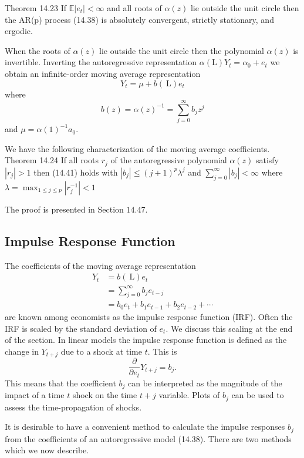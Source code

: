 \documentclass[10pt]{article}
\begin{document}
Theorem 14.23 If $\mathbb{E}\left|e_{t}\right|<\infty$ and all roots of $\alpha(z)$ lie outside the unit circle then the AR(p) process (14.38) is absolutely convergent, strictly stationary, and ergodic.

When the roots of $\alpha(z)$ lie outside the unit circle then the polynomial $\alpha(z)$ is invertible. Inverting the autoregressive representation $\alpha(\mathrm{L}) Y_{t}=\alpha_{0}+e_{t}$ we obtain an infinite-order moving average representation
$$
Y_{t}=\mu+b(\mathrm{~L}) e_{t}
$$
where
$$
b(z)=\alpha(z)^{-1}=\sum_{j=0}^{\infty} b_{j} z^{j}
$$
and $\mu=\alpha(1)^{-1} a_{0}$.

We have the following characterization of the moving average coefficients. Theorem 14.24 If all roots $r_{j}$ of the autoregressive polynomial $\alpha(z)$ satisfy $\left|r_{j}\right|>1$ then (14.41) holds with $\left|b_{j}\right| \leq(j+1)^{p} \lambda^{j}$ and $\sum_{j=0}^{\infty}\left|b_{j}\right|<\infty$ where $\lambda=\max _{1 \leq j \leq p}\left|r_{j}^{-1}\right|<1$

The proof is presented in Section $14.47$.

\subsection{Impulse Response Function}
The coefficients of the moving average representation
$$
\begin{aligned}
Y_{t} &=b(\mathrm{~L}) e_{t} \\
&=\sum_{j=0}^{\infty} b_{j} e_{t-j} \\
&=b_{0} e_{t}+b_{1} e_{t-1}+b_{2} e_{t-2}+\cdots
\end{aligned}
$$
are known among economists as the impulse response function (IRF). Often the IRF is scaled by the standard deviation of $e_{t}$. We discuss this scaling at the end of the section. In linear models the impulse response function is defined as the change in $Y_{t+j}$ due to a shock at time $t$. This is
$$
\frac{\partial}{\partial e_{t}} Y_{t+j}=b_{j} .
$$
This means that the coefficient $b_{j}$ can be interpreted as the magnitude of the impact of a time $t$ shock on the time $t+j$ variable. Plots of $b_{j}$ can be used to assess the time-propagation of shocks.

It is desirable to have a convenient method to calculate the impulse responses $b_{j}$ from the coefficients of an autoregressive model (14.38). There are two methods which we now describe.
\end{document}
